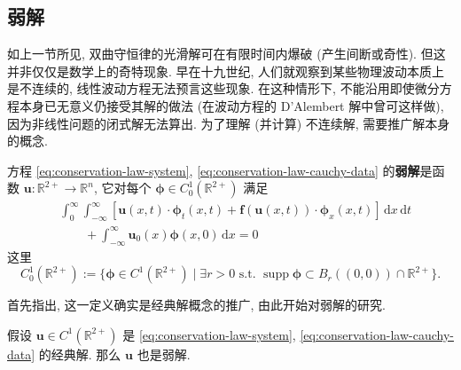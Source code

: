 \subsection{弱解}\label{sec:conservation-weak-solutions}

如上一节所见, 双曲守恒律的光滑解可在有限时间内爆破 (产生间断或奇性). 但这并非仅仅是数学上的奇特现象. 早在十九世纪, 人们就观察到某些物理波动本质上是不连续的, 线性波动方程无法预言这些现象. 在这种情形下, 不能沿用即使微分方程本身已无意义仍接受其解的做法 (在波动方程的 D'Alembert 解中曾可这样做), 因为非线性问题的闭式解无法算出. 为了理解 (并计算) 不连续解, 需要推广解本身的概念.

\begin{Definition}
\label{def:conservation-weak-solution}
方程 \eqref{eq:conservation-law-system}, \eqref{eq:conservation-law-cauchy-data} 的\textbf{弱解}是函数 $\bm{u}:\mathbb{R}^{2+}\to\mathbb{R}^n$, 它对每个 $\bm{\phi}\in C_0^1(\mathbb{R}^{2+})$ 满足
\begin{equation}\label{eq:conservation-weak-solution}
\begin{aligned}
&\int_0^\infty\int_{-\infty}^\infty[\bm{u}(x,t)\cdot\bm{\phi}_t(x,t)+\bm{f}(\bm{u}(x,t))\cdot\bm{\phi}_x(x,t)]\,\mathrm{d}x\,\mathrm{d}t\\
&\qquad+\int_{-\infty}^\infty\bm{u}_0(x)\bm{\phi}(x,0)\,\mathrm{d}x=0
\end{aligned}
\end{equation}
这里
\begin{equation}\label{eq:conservation-test-function-space}
C_0^1(\mathbb{R}^{2+}):=\{\bm{\phi}\in C^1(\mathbb{R}^{2+})\mid\exists r>0\text{ s.t. }\operatorname{supp}\bm{\phi}\subset B_r((0,0))\cap\mathbb{R}^{2+}\}.
\end{equation}

\end{Definition}

首先指出, 这一定义确实是经典解概念的推广, 由此开始对弱解的研究.

\begin{Theorem}
\label{thm:classical-conservation-solutions-weak}
假设 $\bm{u}\in C^1(\mathbb{R}^{2+})$ 是 \eqref{eq:conservation-law-system}, \eqref{eq:conservation-law-cauchy-data} 的经典解. 那么 $\bm{u}$ 也是弱解.
\end{Theorem}

